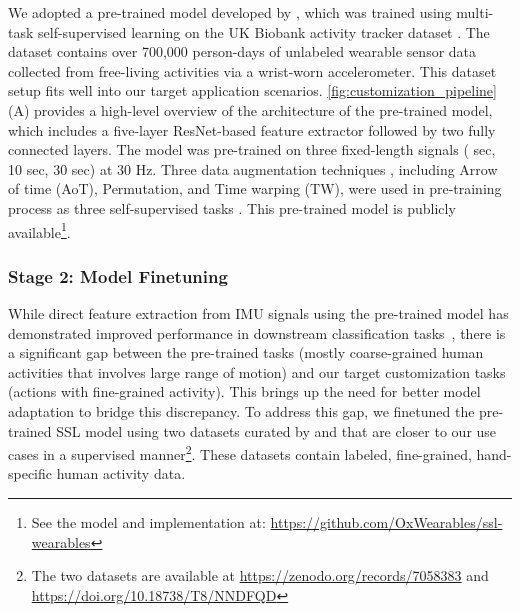We adopted a pre-trained model developed by \citet{yuan2024self}, which was trained using multi-task self-supervised learning on the UK Biobank activity tracker dataset \cite{doherty2017large}. The dataset contains over 700,000 person-days of unlabeled wearable sensor data collected from free-living activities via a wrist-worn accelerometer.
This dataset setup fits well into our target application scenarios.
\autoref{fig:customization_pipeline}(A) provides a high-level overview of the architecture of the pre-trained model, which includes a five-layer ResNet-based feature extractor \cite{he2016deep} followed by two fully connected layers.
The model was pre-trained on three fixed-length signals ( sec, 10 sec, 30 sec) at 30 Hz.
Three data augmentation techniques \cite{um2017data}, including Arrow of time (AoT), Permutation, and Time warping (TW), were used in pre-training process as three self-supervised tasks \cite{saeed2019multi}.
This pre-trained model is publicly available\footnote{See the model and implementation at: \hyperlink{https://github.com/OxWearables/ssl-wearables}{https://github.com/OxWearables/ssl-wearables}}.



\subsubsection{Stage 2: Model Finetuning}
\label{subsub:methods:system:finetune}

While direct feature extraction from IMU signals using the pre-trained model has demonstrated improved performance in downstream classification tasks~\cite{yuan2024self}, there is a significant gap between the pre-trained tasks (\ie mostly coarse-grained human activities that involves large range of motion) and our target customization tasks (\ie actions with fine-grained activity).
This brings up the need for better model adaptation to bridge this discrepancy.
To address this gap, we finetuned the pre-trained SSL model using two datasets curated by \citet{hu_2022_7058383} and \citet{bhattacharya2022leveraging} that are closer to our use cases in a supervised manner\footnote{The two datasets are available at \hyperlink{https://zenodo.org/records/7058383}{https://zenodo.org/records/7058383} and \hyperlink{https://doi.org/10.18738/T8/NNDFQD}{https://doi.org/10.18738/T8/NNDFQD}}.
These datasets contain labeled, fine-grained, hand-specific human activity data.

